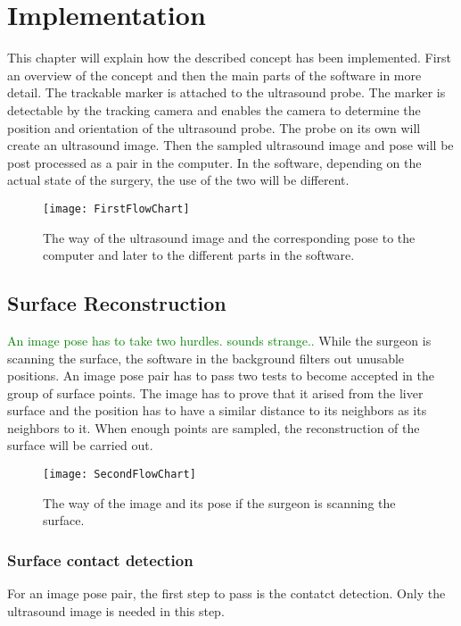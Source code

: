 \chapter{Implementation}
This chapter will explain how the described concept has been implemented.
First an overview of the concept and then the main parts of the software in more
detail.
The trackable marker is attached to the ultrasound probe. The marker is
detectable by the tracking camera and enables the camera to determine the
position and orientation of the ultrasound probe. The probe on its own will
create an ultrasound image. Then the sampled ultrasound image and pose will be
post processed as a pair in the computer. In the software, depending on the
actual state of the surgery, the use of the two will be different.

\begin{figure}[H]
  \centering
 \texttt{[image: FirstFlowChart]}
  \caption{The way of the ultrasound image and the corresponding pose to the
    computer and later to the different parts in the software.}
  \label{fig:FirstFlowChart}
\end{figure}

\section{Surface Reconstruction}


\textcolor{green}{An image pose has to take two hurdles. sounds strange..}
While the surgeon is scanning the surface, the software in the background
filters out unusable positions. An image pose pair has to pass two tests to
become accepted in the group of surface points. The image has to prove that it
arised from the liver surface and the position has to have a similar distance to
its neighbors as its neighbors to it. 
When enough points are sampled, the reconstruction of the surface will be
carried out.
\begin{figure}[H]
  \centering
 \texttt{[image: SecondFlowChart]}
  \caption{The way of the image and its pose if the surgeon is scanning the
    surface.}
  \label{fig:SecondFlowChart}
\end{figure}

\subsection{Surface contact detection}
For an image pose pair, the first step to pass is the contatct detection. Only
the ultrasound image is needed in this step. 

